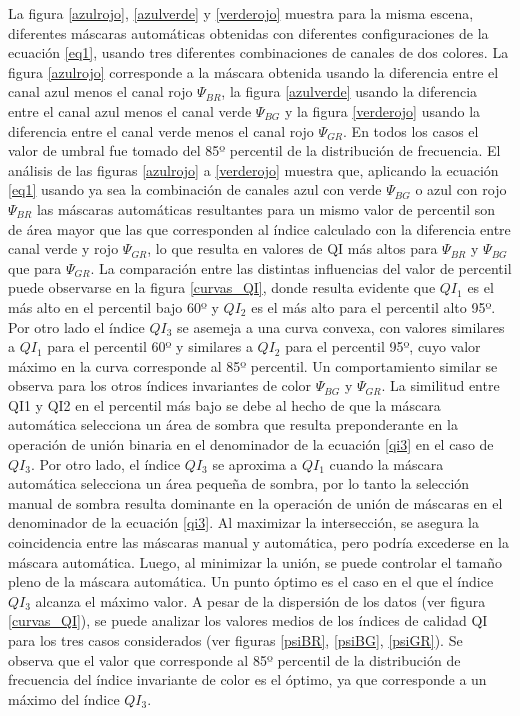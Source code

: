 La figura \ref{azulrojo}, \ref{azulverde} y \ref{verderojo} muestra para la misma escena, diferentes máscaras automáticas obtenidas con diferentes configuraciones de la ecuación \ref{eq1}, usando tres diferentes combinaciones de canales de dos colores. La figura \ref{azulrojo} corresponde a la máscara obtenida usando la diferencia entre el canal azul menos el canal rojo $\Psi_{BR}$, la figura \ref{azulverde} usando la diferencia entre el canal azul menos el canal verde $\Psi_{BG}$ y la figura \ref{verderojo} usando la diferencia entre el canal verde menos el canal rojo $\Psi_{GR}$. En todos los casos el valor de umbral fue tomado del 85º percentil de la distribución de frecuencia. El análisis de las figuras \ref{azulrojo} a \ref{verderojo} muestra que, aplicando la ecuación \ref{eq1} usando ya sea la combinación de canales azul con verde $\Psi_{BG}$ o azul con rojo $\Psi_{BR}$  las máscaras automáticas resultantes para un mismo valor de percentil son de área mayor que las que corresponden al índice calculado con la diferencia entre canal verde y rojo $\Psi_{GR}$, lo que resulta en valores de QI más altos para $\Psi_{BR}$ y $\Psi_{BG}$ que para $\Psi_{GR}$. La comparación entre las distintas influencias del valor de percentil puede observarse en la figura \ref{curvas_QI}, donde resulta evidente que $QI_1$ es el más alto en el percentil bajo 60º y $QI_2$ es el más alto para el percentil alto 95º. Por otro lado el índice $QI_3$ se asemeja a una curva convexa, con valores similares a $QI_1$ para el percentil 60º y similares a $QI_2$ para el percentil 95º, cuyo valor máximo en la curva corresponde al 85º percentil. Un comportamiento similar se observa para los otros índices invariantes de color $\Psi_{BG}$ y $\Psi_{GR}$. La similitud entre QI1 y QI2 en el percentil más bajo se debe al hecho de que la máscara automática selecciona un área de sombra que resulta preponderante en la operación de unión binaria en el denominador de la ecuación \ref{qi3} en el caso de $QI_3$.
Por otro lado, el índice $QI_3$ se aproxima a $QI_1$ cuando la máscara automática selecciona un área pequeña de sombra, por lo tanto la selección manual de sombra resulta dominante en la operación de unión de máscaras en el denominador de la ecuación \ref{qi3}.
Al maximizar la intersección, se asegura la coincidencia entre las máscaras manual y automática, pero podría excederse en la máscara automática. Luego, al minimizar la unión, se puede controlar el tamaño pleno de la máscara automática. Un punto óptimo es el caso en el que el índice $QI_3$ alcanza el máximo valor. A pesar de la dispersión de los datos (ver figura \ref{curvas_QI}), se puede analizar los valores medios de los índices de calidad QI para los tres casos considerados (ver figuras \ref{psiBR}, \ref{psiBG}, \ref{psiGR}). Se observa que el valor que corresponde al 85º percentil de la distribución de frecuencia del índice invariante de color es el óptimo, ya que corresponde a un máximo del índice $QI_3$.
